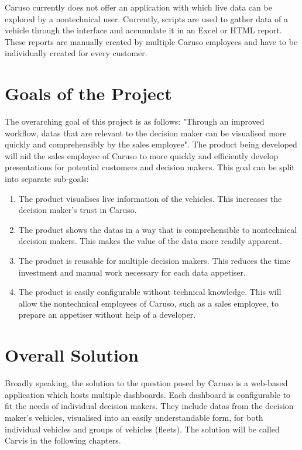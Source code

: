 Caruso currently does not offer an application with which live data can be explored by a \gls{nontechnical} user. Currently, scripts are used to gather data of a vehicle through the interface and accumulate it in an Excel or HTML report. These reports are manually created by multiple Caruso employees and have to be individually created for every customer.

\section{Goals of the Project}
The overarching goal of this project is as follows: "Through an improved workflow, \glspl{data} that are relevant to the decision maker can be visualised more quickly and comprehensibly by the sales employee". The product being developed will aid the sales employee of Caruso to more quickly and efficiently develop presentations for potential customers and decision makers. This goal can be split into separate sub-goals: 
\begin{enumerate}
  \item The product visualises live information of the vehicles. This increases the decision maker's trust in Caruso.
  \item The product shows the \glspl{data} in a way that is comprehensible to \gls{nontechnical} decision makers. This makes the value of the data more readily apparent.
  \item The product is reusable for multiple decision makers. This reduces the time investment and manual work necessary for each data \gls{appetiser}.
  \item The product is easily configurable without technical knowledge. This will allow the \gls{nontechnical} employees of Caruso, such as a sales employee, to prepare an \gls{appetiser} without help of a developer.
\end{enumerate}

\section{Overall Solution}
Broadly speaking, the solution to the question posed by Caruso is a web-based application which hosts multiple dashboards. Each dashboard is configurable to fit the needs of individual decision makers. They include \glspl{data} from the decision maker's vehicles, visualised into an easily understandable form, for both individual vehicles and groups of vehicles (fleets). The solution will be called Carvis in the following chapters.